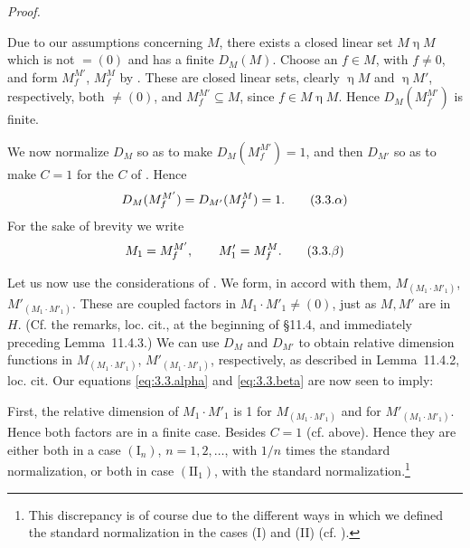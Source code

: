 \documentclass[b5paper,twoside]{article}
\theoremstyle{mvnplain}
\renewenvironment{proof}[1][Proof]{%
  \par\addvspace{0.35\baselineskip}%
  \noindent\textit{#1.}\ \normalfont\ignorespaces
}{%
  \par\addvspace{0.35\baselineskip}%
}
\newcommand{\M}{\mathbf M}
\newcommand{\Hilbert}{\mathfrak H}
\def\M{M}%
\def\Hilbert{H}%
\def\mathfrak#1{#1}%
\begin{document}
\begin{proof}
Due to our assumptions concerning \(\M\), there exists a closed linear set
\(\mathfrak M\mathrel{\eta}\M\) which is not \(=(0)\) and has a finite
\(D_{\M}(\mathfrak M)\). Choose an \(f\in\mathfrak M\), with \(f\ne0\),
and form \(\mathfrak M_f^{\M'}\), \(\mathfrak M_f^{\M}\) by
\cite[p.~143, Def.~5.1.1]{ref5}. These are closed linear sets, clearly
\(\mathrel{\eta}\M\) and \(\mathrel{\eta}\M'\), respectively, both \(\ne(0)\), and
\(\mathfrak M_f^{\M'}\subseteq\mathfrak M\), since
\(f\in\mathfrak M\mathrel{\eta}\M\). Hence \(D_{\M}(\mathfrak M_f^{\M'})\) is
finite.

We now normalize \(D_{\M}\) so as to make
\(D_{\M}(\mathfrak M_f^{\M'})=1\), and then \(D_{\M'}\) so as to make
\(C=1\) for the \(C\) of \cite[p.~182, Theorem~X]{ref5}. Hence
\begin{equation}
  D_{\M}(\mathfrak M_f^{\M'})
  =D_{\M'}(\mathfrak M_f^{\M})=1.
  \tag{3.3.\ensuremath{\alpha}}\label{eq:3.3.alpha}
\end{equation}
For the sake of brevity we write
\begin{equation}
  \mathfrak M_1=\mathfrak M_f^{\M'},
  \qquad
  \mathfrak M'_1=\mathfrak M_f^{\M}.
  \tag{3.3.\ensuremath{\beta}}\label{eq:3.3.beta}
\end{equation}

Let us now use the considerations of \cite[pp.~188--190, \S11.4]{ref5}. We
form, in accord with them,
\(\M_{(\mathfrak M_1\cdot\mathfrak M'_1)}\),
\(\M'_{(\mathfrak M_1\cdot\mathfrak M'_1)}\). These are coupled factors in
\(\mathfrak M_1\cdot\mathfrak M'_1\ne(0)\), just as \(\M,\M'\) are in
\(\Hilbert\). (Cf. the remarks, loc. cit., at the beginning of \S11.4, and
immediately preceding Lemma~11.4.3.) We can use \(D_{\M}\) and
\(D_{\M'}\) to obtain relative dimension functions in
\(\M_{(\mathfrak M_1\cdot\mathfrak M'_1)}\),
\(\M'_{(\mathfrak M_1\cdot\mathfrak M'_1)}\), respectively, as described in
Lemma~11.4.2, loc. cit. Our equations \eqref{eq:3.3.alpha} and
\eqref{eq:3.3.beta} are now seen to imply:

First, the relative dimension of
\(\mathfrak M_1\cdot\mathfrak M'_1\) is 1 for
\(\M_{(\mathfrak M_1\cdot\mathfrak M'_1)}\) and for
\(\M'_{(\mathfrak M_1\cdot\mathfrak M'_1)}\). Hence both factors are in a
finite case. Besides \(C=1\) (cf. above). Hence they are either both in a case
\((\mathrm I_n)\), \(n=1,2,\ldots\), with \(1/n\) times the standard
normalization, or both in case \((\mathrm {II}_1)\), with the standard
normalization.\footnote{This discrepancy is of course due to the different
ways in which we defined the standard normalization in the cases (I) and (II)
(cf. \cite[p.~172, Theorem~VIII]{ref5}).}


\end{proof}
\end{document}
